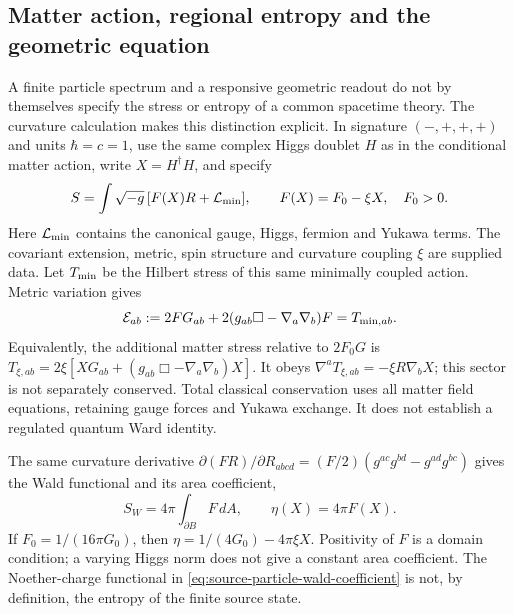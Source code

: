 \subsection{Matter action, regional entropy and the geometric equation}
\label{sec:source-particle-einstein-join}

A finite particle spectrum and a responsive geometric readout do not by
themselves specify the stress or entropy of a common spacetime theory.
The curvature calculation makes this distinction explicit. In signature
$(-,+,+,+)$ and units $\hbar=c=1$, use the same complex Higgs doublet
$H$ as in the conditional matter action, write $X=H^\dagger H$, and specify
\begin{equation}
 S=\int\sqrt{-g}\,[F(X)R+\mathcal L_{\rm min}],\qquad
 F(X)=F_0-\xi X,\quad F_0>0.
 \label{eq:source-particle-curvature-action}
\end{equation}
Here $\mathcal L_{\rm min}$ contains the canonical gauge, Higgs, fermion
and Yukawa terms. The covariant extension, metric, spin structure and
curvature coupling $\xi$ are supplied data. Let $T_{\rm min}$ be the
Hilbert stress of this same minimally coupled action. Metric variation
gives
\begin{equation}
 \mathcal E_{ab}:=2FG_{ab}
       +2(g_{ab}\Box-\nabla_a\nabla_b)F=T_{{\rm min},ab}.
 \label{eq:source-particle-metric-equation}
\end{equation}
Equivalently, the additional matter stress relative to $2F_0G$ is
$T_{\xi,ab}=2\xi[XG_{ab}+(g_{ab}\Box-\nabla_a\nabla_b)X]$.
It obeys $\nabla^aT_{\xi,ab}=-\xi R\nabla_bX$; this sector is not
separately conserved. Total classical conservation uses all matter
field equations, retaining gauge forces and Yukawa exchange. It does
not establish a regulated quantum Ward identity.

The same curvature derivative
$\partial(FR)/\partial R_{abcd}
 =(F/2)(g^{ac}g^{bd}-g^{ad}g^{bc})$
gives the Wald functional and its area coefficient,
\begin{equation}
 S_W=4\pi\int_{\partial B}F\,dA,\qquad
 \eta(X)=4\pi F(X).
 \label{eq:source-particle-wald-coefficient}
\end{equation}
If $F_0=1/(16\pi G_0)$, then
$\eta=1/(4G_0)-4\pi\xi X$. Positivity of $F$ is a domain condition;
a varying Higgs norm does not give a constant area coefficient.
The Noether-charge functional in
\eqref{eq:source-particle-wald-coefficient} is not, by definition, the
entropy of the finite source state.

